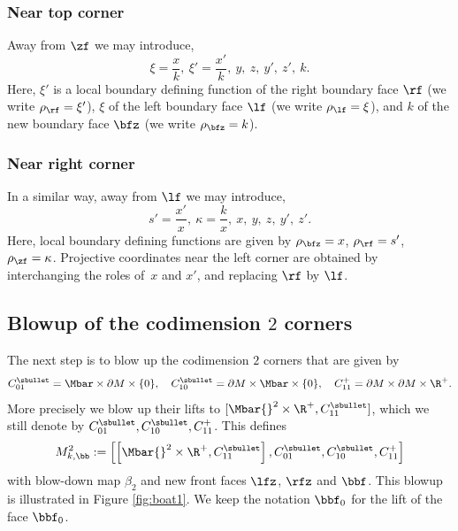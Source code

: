 \subsubsection*{Near top corner}
Away from $\zf$ we may introduce,
\begin{equation} \label{top corner}
\xi = \frac{x}{k}, \ \xi' = \frac{x'}{k}, \ y, \ z, \ y', \ z', \ k.
\end{equation}
Here, $\xi'$ is a local boundary defining function of the right boundary face $\rf$
(we write $\rho_{\rf} = \xi'$), $\xi$ of the
left boundary face $\lf$ (we write $\rho_{\lf} = \xi$), and $k$ of the new boundary face $\bfz$
(we write $\rho_{\bfz} = k$).

\subsubsection*{Near right corner}
In a similar way, away from $\lf$ we may introduce,
\begin{equation}\label{right corner}
s' = \frac{x'}{x}, \ \kappa = \frac{k}{x}, \ x, \ y, \ z, \ y', \ z'.
\end{equation}
Here, local boundary defining functions are given by
$ \rho_{\bfz} = x$, $\rho_{\rf} = s'$, $\rho_{\zf} = \kappa$.
Projective coordinates near the left corner are obtained by interchanging the
roles of~$x$ and $x'$, and replacing $\rf$ by $\lf$.

\subsection{Blowup of the codimension $2$ corners}
The next step is to blow up the codimension $2$ corners
that are given by
\begin{align*}
C_{01}^\sbullet = \Mbar \times \partial M \times \{0\}, \quad
C_{10}^\sbullet = \partial M \times \Mbar \times \{0\}, \quad
C_{11}^+ = \partial M \times \partial M \times \R^+.
\end{align*}
More precisely we blow up their lifts to $[\Mbar{}^2 \times \R^+, C_{11}^\sbullet]$,
which we still denote by $C_{01}^\sbullet, C_{10}^\sbullet, C_{11}^+$.
This defines
\begin{equation}\label{M2kb}
M^{2}_{k,\bb} := \left[ \left[\Mbar{}^2 \times \R^+, C_{11}^\sbullet\right], C_{01}^\sbullet, C_{10}^\sbullet, C_{11}^+\right]
\end{equation}
with blow-down map $\beta_2$ and new front faces $\lfz$, $\rfz$ and $\bbf$.
This blowup is illustrated in Figure \ref{fig:boat1}.
We keep the notation $\bbf_0$ for the lift of the face $\bbf_0$.

